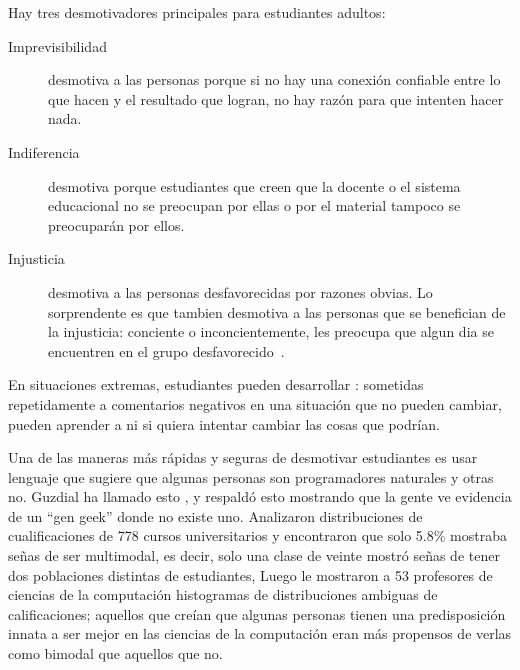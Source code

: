 Hay tres desmotivadores principales para estudiantes adultos:

\begin{description}

\item[Imprevisibilidad]
  desmotiva a las personas porque
  si no hay una conexión confiable entre lo que hacen y el resultado que logran,
  no hay razón para que intenten hacer nada.

\item[Indiferencia]
  desmotiva porque
  estudiantes que creen que la docente o el sistema educacional no se preocupan por ellas
  o por el material tampoco se preocuparán por ellos.

\item[Injusticia]
  desmotiva a las personas desfavorecidas por razones obvias.
  Lo sorprendente es que tambien desmotiva a las personas que se benefician de la injusticia:
  conciente o inconcientemente,
  les preocupa que
  algun dia se encuentren en el grupo desfavorecido~\cite{Wilk2011}.

\end{description}

En situaciones extremas,
estudiantes pueden desarrollar :
sometidas repetidamente a comentarios negativos en una situación que no pueden cambiar,
pueden aprender a ni si quiera intentar cambiar las cosas que podrían.

Una de las maneras más rápidas y seguras de desmotivar estudiantes es
usar lenguaje que sugiere que algunas personas son programadores naturales y otras no.
Guzdial ha llamado esto
,
y \cite{Pati2016} respaldó esto mostrando que
la gente ve evidencia de un ``gen geek'' donde no existe uno.
Analizaron distribuciones de cualificaciones de 778 cursos universitarios y encontraron que solo 5.8\% mostraba señas
de ser multimodal,
es decir, solo una clase de veinte mostró señas de tener dos poblaciones distintas de estudiantes,
Luego le mostraron a 53 profesores de ciencias de la computación histogramas de distribuciones ambiguas de calificaciones;
aquellos que creían que algunas personas tienen una predisposición innata a ser mejor en las ciencias de la computación
eran más propensos de verlas como bimodal que aquellos que no.

